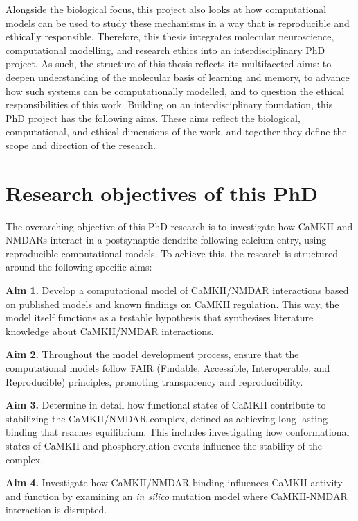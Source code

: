 \documentclass[
  11pt,
  letterpaper,
]{scrreprt}
\begin{document}
Alongside the biological focus, this project also looks at how
computational models can be used to study these mechanisms in a way that
is reproducible and ethically responsible. Therefore, this thesis
integrates molecular neuroscience, computational modelling, and research
ethics into an interdisciplinary PhD project. As such, the structure of
this thesis reflects its multifaceted aims: to deepen understanding of
the molecular basis of learning and memory, to advance how such systems
can be computationally modelled, and to question the ethical
responsibilities of this work. Building on an interdisciplinary
foundation, this PhD project has the following aims. These aims reflect
the biological, computational, and ethical dimensions of the work, and
together they define the scope and direction of the research.

\section*{Research objectives of this PhD}\label{sec-objectives}


The overarching objective of this PhD research is to investigate how
CaMKII and NMDARs interact in a postsynaptic dendrite following calcium
entry, using reproducible computational models. To achieve this, the
research is structured around the following specific aims:

\textbf{Aim 1.} Develop a computational model of CaMKII/NMDAR
interactions based on published models and known findings on CaMKII
regulation. This way, the model itself functions as a testable
hypothesis that synthesises literature knowledge about CaMKII/NMDAR
interactions.

\textbf{Aim 2.} Throughout the model development process, ensure that
the computational models follow FAIR (Findable, Accessible,
Interoperable, and Reproducible) principles, promoting transparency and
reproducibility.

\textbf{Aim 3.} Determine in detail how functional states of CaMKII
contribute to stabilizing the CaMKII/NMDAR complex, defined as achieving
long-lasting binding that reaches equilibrium. This includes
investigating how conformational states of CaMKII and phosphorylation
events influence the stability of the complex.

\textbf{Aim 4.} Investigate how CaMKII/NMDAR binding influences CaMKII
activity and function by examining an \emph{in silico} mutation model
where CaMKII-NMDAR interaction is disrupted.
\end{document}
